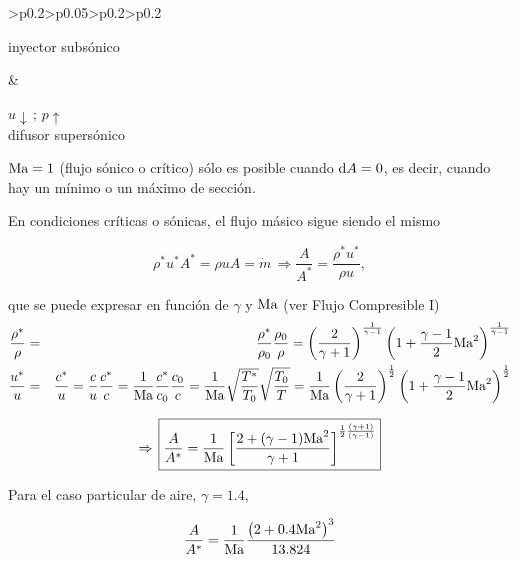\begin{center}
\begin{tabular}{>{\centering}p{0.2\columnwidth}>{\centering}p{0.05\columnwidth}>{\centering}p{0.2\columnwidth}>{\centering}p{0.2\columnwidth}}
\begin{minipage}[c]{1\linewidth}
\begin{center}
					inyector subsónico 
					\par\end{center}%
			\end{minipage} & %
			\noindent\begin{minipage}[c]{1\linewidth}%
				\begin{center}
					$u\downarrow\,;\,p\uparrow$ \\
					difusor supersónico 
					\par\end{center}%
			\end{minipage}\tabularnewline
		\end{tabular}
		\par\end{center}
	
	$\text{Ma}=1$ (flujo sónico o crítico) sólo es posible cuando $\text{d} A=0$,
	es decir, cuando hay un mínimo o un máximo de sección.
	
	En condiciones críticas o sónicas, el flujo másico sigue siendo el
	mismo 
	
\begin{equation}
		\rho^{*}u^{*}A^{*}=\rho uA=\dot{m}\,\Rightarrow\frac{A}{A^{*}}=\frac{\rho^{*}u^{*}}{\rho u},
\end{equation}
	
	que se puede expresar en función de $\gamma$ y $\text{Ma}$ (ver Flujo
	Compresible I) 
		\begin{eqnarray*}
			\frac{\rho^{*}}{\rho} & = & \frac{\rho^{*}}{\rho_{0}}\frac{\rho_{0}}{\rho}=\left(\frac{2}{\gamma+1}\right)^{\frac{1}{\gamma-1}}\left(1+\frac{\gamma-1}{2}\text{Ma}^{2}\right)^{\frac{1}{\gamma-1}}\\
			\frac{u^{*}}{u} & = & \frac{c^{*}}{u}=\frac{c}{u}\frac{c^{*}}{c}=\frac{1}{\text{Ma}}\frac{c^{*}}{c_{0}}\frac{c_{0}}{c}=\frac{1}{\text{Ma}}\sqrt{\frac{T^{*}}{T_{0}}}\sqrt{\frac{T_{0}}{T}}=\frac{1}{\text{Ma}}\left(\frac{2}{\gamma+1}\right)^{\frac{1}{2}}\left(1+\frac{\gamma-1}{2}\text{Ma}^{2}\right)^{\frac{1}{2}}
		\end{eqnarray*}
	
		
\begin{equation}
			\Rightarrow\,\boxed{\frac{A}{A^{*}}=\frac{1}{\text{Ma}}\left[\frac{2+(\gamma-1)\text{Ma}^{2}}{\gamma+1}\right]^{\frac{1}{2}\frac{(\gamma+1)}{(\gamma-1)}}}
\end{equation}
		
	
	
	Para el caso particular de aire, $\gamma=1.4$, 
	
\begin{equation}
		\frac{A}{A^{*}}=\frac{1}{\text{Ma}}\frac{\left(2+0.4\text{Ma}^{2}\right)^{3}}{13.824}
\end{equation}
	
